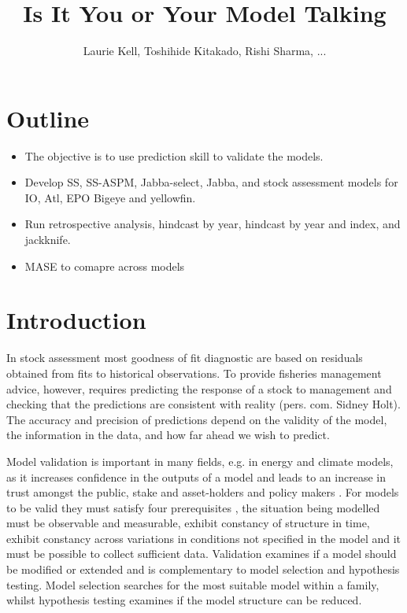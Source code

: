 \documentclass[a4paper]{article}
\title{Is It You or Your Model Talking}
\author{Laurie Kell, Toshihide Kitakado, Rishi Sharma, ...}
\begin{document}
\maketitle

\begin{abstract}

\end{abstract}

\section{Outline}


\begin{itemize}
    \item The objective is to use prediction skill to validate the models.
    \item Develop SS, SS-ASPM, Jabba-select, Jabba, and stock assessment models for IO, Atl, EPO Bigeye and yellowfin.
    \item Run retrospective analysis, hindcast by year, hindcast by year and index, and jackknife.
    \item MASE to comapre across models
\end{itemize}

\section{Introduction}

In stock assessment most goodness of fit diagnostic are based on residuals obtained from fits to historical observations. To provide fisheries management advice, however, requires predicting the response of a stock to management and checking that the predictions are consistent with reality (pers. com. Sidney Holt). The accuracy and precision of predictions depend on the validity of the model, the information in the data, and how far ahead we wish to predict. 

Model validation is important in many fields, e.g. in energy and climate models, as it increases confidence in the outputs of a model and leads to an increase in trust amongst the public, stake and asset-holders and policy makers \citep{kellSubmitted}. For models to be valid they must satisfy four prerequisites \citep{hodge1992}, the situation being modelled must be observable and measurable, exhibit constancy of structure in time, exhibit constancy across variations in conditions not specified in the model and it must be possible to collect sufficient data. Validation examines if a model should be modified or extended and is complementary to model selection and hypothesis testing. Model selection searches for the most suitable model within a family, whilst hypothesis testing examines if the model structure can be reduced.
\end{document}
